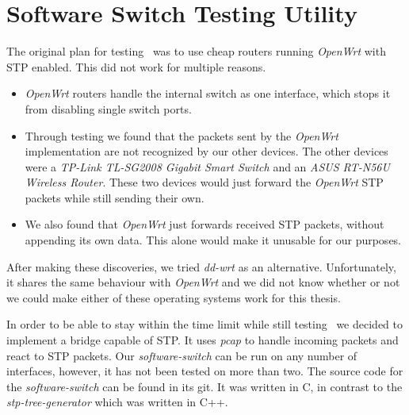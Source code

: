 \chapter{Software Switch Testing Utility}
\label{switch}
The original plan for testing \tool\ was to use cheap routers running \textit{OpenWrt}\cite{OpenWrt} with STP enabled.
This did not work for multiple reasons.
\begin{itemize}
    \item \textit{OpenWrt} routers handle the internal switch as one interface, which stops it from disabling single switch ports.
    \item Through testing we found that the packets sent by the \textit{OpenWrt} implementation are not recognized by our other devices.
    The other devices were a \textit{TP-Link TL-SG2008 Gigabit Smart Switch} and an \textit{ASUS RT-N56U Wireless Router}.
    These two devices would just forward the \textit{OpenWrt} STP packets while still sending their own.
    \item We also found that \textit{OpenWrt} just forwards received STP packets, without appending its own data.
    This alone would make it unusable for our purposes.
\end{itemize}

After making these discoveries, we tried \textit{dd-wrt}\cite{dd-wrt} as an alternative.
Unfortunately, it shares the same behaviour with \textit{OpenWrt} and we did not know whether or not we could make either of these operating systems work for this thesis.

In order to be able to stay within the time limit while still testing \tool\, we decided to implement a bridge capable of STP.
It uses \textit{pcap} to handle incoming packets and react to STP packets.
Our \textit{software-switch} can be run on any number of interfaces, however, it has not been tested on more than two.
The source code for the \textit{software-switch} can be found in its git\cite{soft-switch}.
It was written in C, in contrast to the \textit{stp-tree-generator} which was written in C++.

